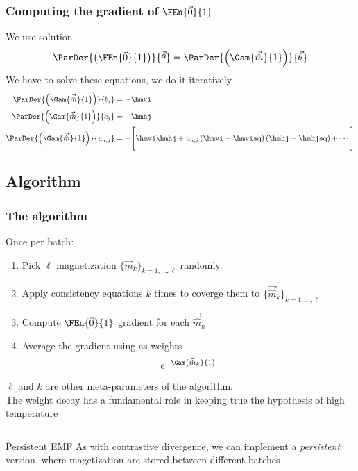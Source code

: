 \begin{frame}
  \frametitle{Computing the gradient of \(\FEn{\vec{0}}{1}\)}
  We use solution 
  \[
  \ParDer{\left(\FEn{\vec{0}}{1}\right)}{\vec{\theta}} =
  \ParDer{\left(\Gam{\vec{\hat{m}}}{1}\right)}{\vec{\theta}}
  \]  
  We  have to solve these equations, we do it iteratively
  \begin{align*}
    \ParDer{\left(\Gam{\vec{\hat{m}}}{1}\right)}{b_i} &= -\hmvi\\
    \ParDer{\left(\Gam{\vec{\hat{m}}}{1}\right)}{c_j} &= -\hmhj\\
    \ParDer{\left(\Gam{\vec{\hat{m}}}{1}\right)}{w_{i,j}}
    &=-\Bigg[\hmvi\hmhj +w_{i,j}\left(\hmvi-\hmvisq\right)\left(\hmhj-\hmhjsq\right)+ \cdots \Bigg]
  \end{align*}
\end{frame}


\subsection{Algorithm}
\begin{frame}
  \frametitle{The algorithm}
  Once per batch:
  \begin{enumerate}
    \item Pick \(\ell\) magnetization \(\{\vec{m}_k\}_{k=1,\dots,\ell}\) randomly.
    \item Apply consistency equations \(k\) times to coverge them to \(\{\vec{\hat{m}}_k\}_{k=1,\dots,\ell}\)
    \item Compute \(\FEn{\vec{0}}{1}\) gradient for each \(\vec{\hat{m}}_k\)
    \item Average the gradient using as weights
    \[
      e^{-\Gam{\vec{\hat{m}}_k}{1}}
    \]
  \end{enumerate}
  \(\ell\) and \(k\) are other meta-parameters of the algorithm.\\
  The \alert{weight decay} has a fundamental role in keeping true the hypothesis of high temperature
  \begin{columns}
     \begin{alertblock}{Persistent EMF}
       As with contrastive divergence, we can implement a \emph{persistent} version, where magetization are stored between different batches
     \end{alertblock}
  \end{columns}
\end{frame}


















